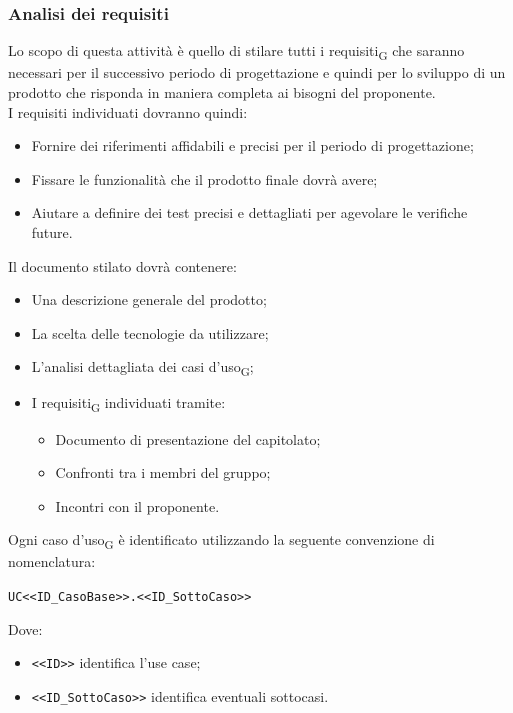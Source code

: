     \subsubsection{Analisi dei requisiti}
    Lo scopo di questa attività è quello di stilare tutti i requisiti\textsubscript{G} che saranno necessari per il successivo periodo di progettazione e quindi per lo sviluppo di un prodotto che risponda in maniera completa ai bisogni del proponente. \\
    I requisiti individuati dovranno quindi:
    \begin{itemize}
    	\item Fornire dei riferimenti affidabili e precisi per il periodo di progettazione;
    	\item Fissare le funzionalità che il prodotto finale dovrà avere;
    	\item Aiutare a definire dei test precisi e dettagliati per agevolare le verifiche future.
    \end{itemize}
    Il documento stilato dovrà contenere:
    \begin{itemize}
    	\item Una descrizione generale del prodotto;
    	\item La scelta delle tecnologie da utilizzare;
    	\item L'analisi dettagliata dei casi d'uso\textsubscript{G};
    	\item I requisiti\textsubscript{G} individuati tramite:
        \begin{itemize}
            \item Documento di presentazione del capitolato;
            \item Confronti tra i membri del gruppo;
            \item Incontri con il proponente.
        \end{itemize}
    \end{itemize} 
    Ogni caso d'uso\textsubscript{G} è identificato utilizzando la seguente convenzione di nomenclatura:
    \begin{center}
		\verb|UC<<ID_CasoBase>>.<<ID_SottoCaso>>|
    \end{center}
    Dove:
    \begin{itemize}
    	\item \verb|<<ID>>| identifica l'use case;
    	\item \verb|<<ID_SottoCaso>>| identifica eventuali sottocasi.
    \end{itemize}
